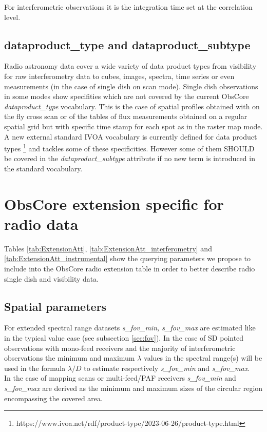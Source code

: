 \documentclass[11pt,a4paper]{ivoa}
\begin{document}
For interferometric observations it is the integration time set at the correlation level.

\subsection{dataproduct\_type and dataproduct\_subtype}

Radio astronomy data cover a wide variety of data product types from visibility for raw interferometry data to cubes, images, spectra, time series
or even measurements (in the case of single dish on scan mode). Single dish observations in some modes show specifities which are not covered by
the current ObsCore \emph{dataproduct\_type} vocabulary. This is the case of spatial profiles obtained with on the fly cross scan or of the
tables of flux measurements obtained on a regular spatial grid but with specific time stamp for each spot as in the raster map  mode.
A new external standard IVOA vocabulary is currently defined for data product types \footnote{https://www.ivoa.net/rdf/product-type/2023-06-26/product-type.html}
and tackles some of these specificities. However some of them SHOULD be covered in the \emph{dataproduct\_subtype} attribute if no new term is introduced in the standard vocabulary.

\section{ObsCore extension specific for radio data}

Tables \ref{tab:ExtensionAtt}, \ref{tab:ExtensionAtt_interferometry} and \ref{tab:ExtensionAtt_instrumental} show the 
querying parameters we propose to include into the ObsCore radio extension table in order to better describe radio single dish and visibility data.

\subsection{Spatial parameters}

For extended spectral range datasets \emph{s\_fov\_min, s\_fov\_max} are estimated like in the typical value case (see subsection \ref{sec:fov}).  
In the case of SD pointed observations with mono-feed receivers and the majority of interferometric observations the minimum and maximum
$\lambda$ values in the spectral range(s) will be used in the formula  $\lambda / D$ to estimate respectively \emph{s\_fov\_min} and  \emph{s\_fov\_max}. \\
In the case of mapping scans or multi-feed/PAF receivers \emph{ s\_fov\_min} and \emph{s\_fov\_max} are derived as the minimum and maximum sizes of the 
circular region encompassing the covered area.
\end{document}
